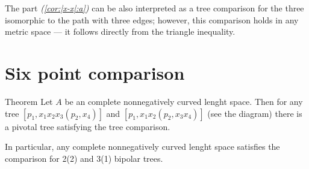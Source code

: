 The part \textit{(\ref{cor:|x-x|:a})} can be also interpreted as a tree comparison for the three isomorphic to the path with three edges;
however, this comparison holds in any metric space --- it follows directly from the triangle inequality.

\section{Six point comparison}


\begin{thm}{Theorem}
Let $A$ be an complete nonnegatively curved lenght space.
Then for any tree $[p_1,x_1x_2x_3(p_2,x_4)]$ and $[p_1,x_1x_2(p_2,x_3x_4)]$ (see the diagram) there is a pivotal tree satisfying the tree comparison.

In particular, any complete nonnegatively curved lenght space satisfies the comparison for 
 2(2) and 3(1) bipolar trees.

\begin{comment}
\begin{center}
\begin{tikzpicture}[scale=1,
  thick,main node/.style={circle,draw,font=\sffamily\bfseries,minimum size=3mm}]
  \node[main node] (1) at (0,0) {};
  \node[main node] (2) at (0,1){};
  \node[main node] (3) at (0,2){};
  \node[main node] (4) at (1,0) {};
  \node[main node] (5) at (1,1) {};
  

  \path[every node/.style={font=\sffamily\small}]
   (1) edge node[above]{}(2)
   (2) edge node[above]{}(3)
   (2) edge node[above]{}(5)
   (4) edge node[above]{}(5);
\end{tikzpicture}
\hskip10mm
\begin{tikzpicture}[scale=1,
  thick,main node/.style={circle,draw,font=\sffamily\bfseries,minimum size=3mm}]

  \node[main node] (1) at (0,0) {};
  \node[main node] (2) at (0,1){};
  \node[main node] (3) at (0,2){};
  \node[main node] (4) at (1,0) {};
  \node[main node] (5) at (1,1) {};
  \node[main node] (6) at (1,2) {};

  \path[every node/.style={font=\sffamily\small}]
   (1) edge node[above]{}(2)
   (2) edge node[above]{}(3)
   (2) edge node[above]{}(5)
   (4) edge node[above]{}(5)
   (5) edge node[above]{}(6);
\end{tikzpicture}
\hskip10mm
\begin{tikzpicture}[scale=1,
  thick,main node/.style={circle,draw,font=\sffamily\bfseries,minimum size=3mm}]

  \node[main node] (1) at (0,1) {};
  \node[main node] (2) at (1,0){};
  \node[main node] (3) at (1,1){};
  \node[main node] (4) at (1,2) {};
  \node[main node] (5) at (2,0) {};
  \node[main node] (6) at (2,1) {};

  \path[every node/.style={font=\sffamily\small}]
   (1) edge node[above]{}(3)
   (2) edge node[above]{}(3)
   (3) edge node[above]{}(6)
   (4) edge node[above]{}(3)
   (5) edge node[above]{}(6);
\end{tikzpicture}
\end{center}
\end{comment}

\end{thm}


